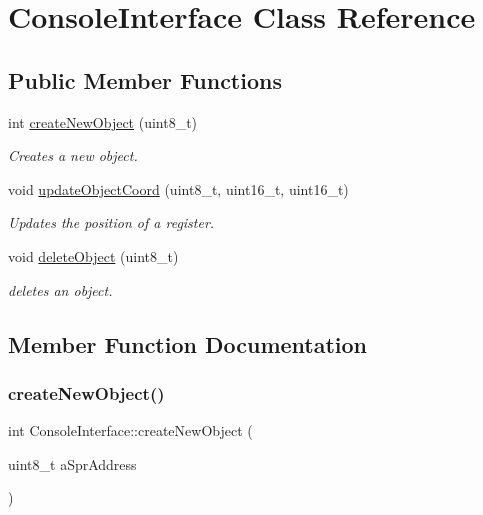 \hypertarget{class_console_interface}{}\section{Console\+Interface Class Reference}
\label{class_console_interface}
\subsection*{Public Member Functions}
\begin{DoxyCompactItemize}
\item 
int \mbox{\hyperlink{class_console_interface_a90bad9fe5033b8fd82b1ae6f8c7b3f43}{create\+New\+Object}} (uint8\+\_\+t)
\begin{DoxyCompactList}\small\item\em Creates a new object. \end{DoxyCompactList}\item 
void \mbox{\hyperlink{class_console_interface_a5362510f12bf757cc4c388a89b3e0477}{update\+Object\+Coord}} (uint8\+\_\+t, uint16\+\_\+t, uint16\+\_\+t)
\begin{DoxyCompactList}\small\item\em Updates the position of a register. \end{DoxyCompactList}\item 
void \mbox{\hyperlink{class_console_interface_a4d9364dacc2bec064ee84abf374053f4}{delete\+Object}} (uint8\+\_\+t)
\begin{DoxyCompactList}\small\item\em deletes an object. \end{DoxyCompactList}\end{DoxyCompactItemize}


\subsection{Member Function Documentation}
\mbox{\label{class_console_interface_a90bad9fe5033b8fd82b1ae6f8c7b3f43}} 
\subsubsection{\texorpdfstring{createNewObject()}{createNewObject()}}
{\footnotesize\ttfamily int Console\+Interface\+::create\+New\+Object (\begin{DoxyParamCaption}\item[{uint8\+\_\+t}]{a\+Spr\+Address }\end{DoxyParamCaption})}



